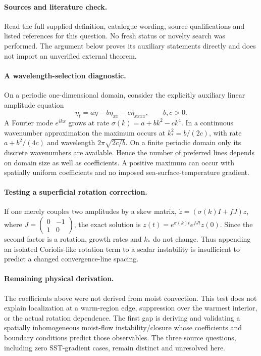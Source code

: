 \documentclass[11pt]{article}
\begin{document}
\paragraph{Sources and literature check.}
Read the full supplied definition, catalogue wording, source qualifications and listed references for this question. No fresh status or novelty search was performed. The argument below proves its auxiliary statements directly and does not import an unverified external theorem.

\paragraph{A wavelength-selection diagnostic.} On a periodic one-dimensional domain, consider the explicitly auxiliary linear amplitude equation
\[
 \eta_t=a\eta-b\eta_{xx}-c\eta_{xxxx},\qquad b,c>0.
\]
A Fourier mode \(e^{ikx}\) grows at rate \(\sigma(k)=a+bk^2-ck^4\). In a continuous wavenumber approximation the maximum occurs at \(k_*^2=b/(2c)\), with rate \(a+b^2/(4c)\) and wavelength \(2\pi\sqrt{2c/b}\). On a finite periodic domain only its discrete wavenumbers are available. Hence the number of preferred lines depends on domain size as well as coefficients. A positive maximum can occur with spatially uniform coefficients and no imposed sea-surface-temperature gradient.
\paragraph{Testing a superficial rotation correction.} If one merely couples two amplitudes by a skew matrix, \(\dot z=(\sigma(k)I+fJ)z\), where \(J=\left(\begin{smallmatrix}0&-1\\1&0\end{smallmatrix}\right)\), the exact solution is \(z(t)=e^{\sigma(k)t}e^{fJt}z(0)\). Since the second factor is a rotation, growth rates and \(k_*\) do not change. Thus appending an isolated Coriolis-like rotation term to a scalar instability is insufficient to predict a changed convergence-line spacing.
\paragraph{Remaining physical derivation.} The coefficients above were not derived from moist convection. This test does not explain localization at a warm-region edge, suppression over the warmest interior, or the actual rotation dependence. The first gap is deriving and validating a spatially inhomogeneous moist-flow instability/closure whose coefficients and boundary conditions predict those observables. The three source questions, including zero SST-gradient cases, remain distinct and unresolved here.
\end{document}
